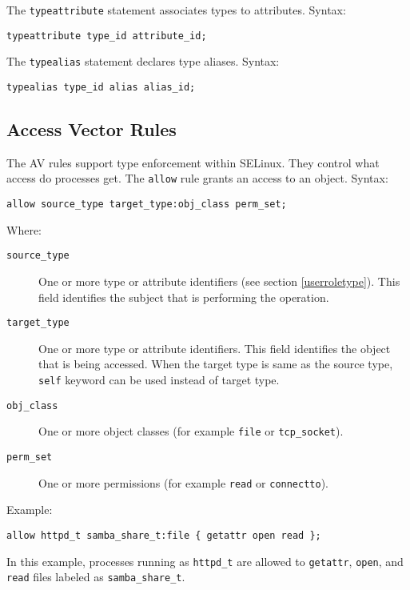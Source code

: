 The \texttt{typeattribute} statement associates types to attributes. Syntax:
\begin{lstlisting}[language=te]
typeattribute type_id attribute_id;
\end{lstlisting}

The \texttt{typealias} statement declares type aliases. Syntax:
\begin{lstlisting}[language=te]
typealias type_id alias alias_id;
\end{lstlisting}

\subsection{Access Vector Rules}
\label{avrules}
The AV rules support type enforcement within SELinux. They control what access
do processes get. The \texttt{allow} rule grants an access to an object.
Syntax:
\begin{lstlisting}[language=te]
allow source_type target_type:obj_class perm_set;
\end{lstlisting}
Where:
\begin{description}
    \item [\texttt{source\_type}] One or more type or attribute identifiers (see
        section \ref{userroletype}). This field identifies the subject that is
        performing the operation.
    \item [\texttt{target\_type}] One or more type or attribute identifiers.
        This field identifies the object that is being accessed. When the
        target type is same as the source type, \texttt{self} keyword can be
        used instead of target type.
    \item [\texttt{obj\_class}] One or more object classes (for example
        \texttt{file} or \texttt{tcp\_socket}).
    \item [\texttt{perm\_set}] One or more permissions (for example
        \texttt{read} or \texttt{connectto}).
\end{description}
Example:
\begin{lstlisting}[language=te]
allow httpd_t samba_share_t:file { getattr open read };
\end{lstlisting}
In this example, processes running as \texttt{httpd\_t} are allowed to
\texttt{getattr}, \texttt{open}, and \texttt{read} files labeled as
\texttt{samba\_share\_t}.

